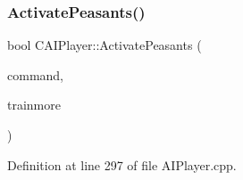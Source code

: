 \subsubsection{\texorpdfstring{Activate\+Peasants()}{ActivatePeasants()}}
{\footnotesize\ttfamily bool C\+A\+I\+Player\+::\+Activate\+Peasants (\begin{DoxyParamCaption}\item[{\hyperlink{structSPlayerCommandRequest}{S\+Player\+Command\+Request} \&}]{command,  }\item[{bool}]{trainmore }\end{DoxyParamCaption})\hspace{0.3cm}{\ttfamily [protected]}}



Definition at line 297 of file A\+I\+Player.\+cpp.


